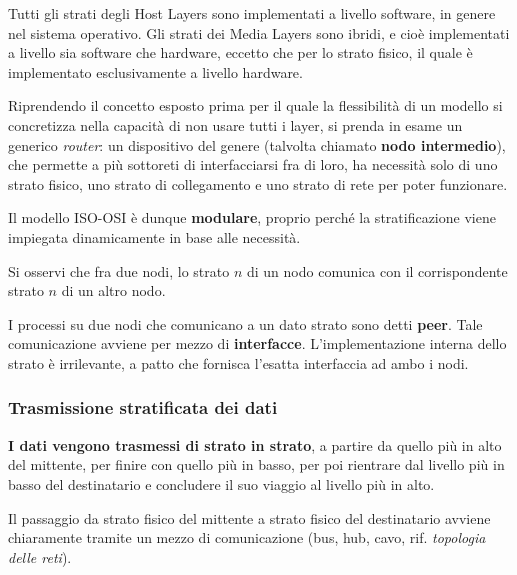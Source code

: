         \vspace{3mm}
        
        Tutti gli strati degli Host Layers sono implementati a livello software, in genere nel sistema operativo. Gli strati dei Media Layers sono ibridi, e cioè implementati a livello sia software che hardware, eccetto che per lo strato fisico, il quale è implementato esclusivamente a livello hardware.
        
        Riprendendo il concetto esposto prima per il quale la flessibilità di un modello si concretizza nella capacità di non usare tutti i layer, si prenda in esame un generico \textit{router}: un dispositivo del genere (talvolta chiamato \textbf{nodo intermedio}), che permette a più sottoreti di interfacciarsi fra di loro, ha necessità solo di uno strato fisico, uno strato di collegamento e uno strato di rete per poter funzionare.
        
        Il modello ISO-OSI è dunque \textbf{modulare}, proprio perché la stratificazione viene impiegata dinamicamente in base alle necessità.
        
        Si osservi che fra due nodi, lo strato \(n\) di un nodo comunica con il corrispondente strato \(n\) di un altro nodo. 
        
        I processi su due nodi che comunicano a un dato strato sono detti \textbf{peer}. Tale comunicazione avviene per mezzo di \textbf{interfacce}. L'implementazione interna dello strato è irrilevante, a patto che fornisca l'esatta interfaccia ad ambo i nodi.
    
    \subsubsection{Trasmissione stratificata dei dati}
    
        \textbf{I dati vengono trasmessi di strato in strato}, a partire da quello più in alto del mittente, per finire con quello più in basso, per poi rientrare dal livello più in basso del destinatario e concludere il suo viaggio al livello più in alto.
        
        \vspace{3mm}
        
        Il passaggio da strato fisico del mittente a strato fisico del destinatario avviene chiaramente tramite un mezzo di comunicazione (bus, hub, cavo, rif. \textit{topologia delle reti}).
        
        \vspace{3mm}
        
